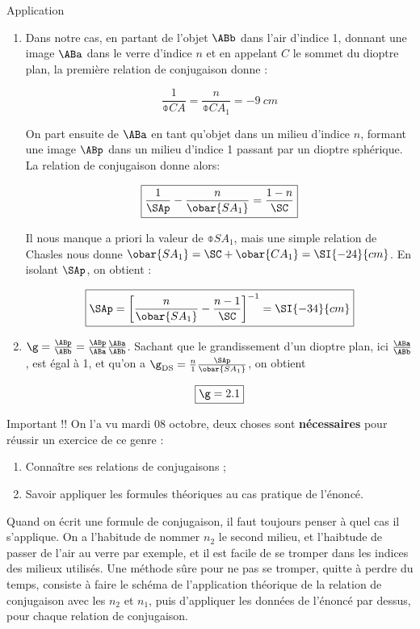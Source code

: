 \documentclass[10pt,notitlepage]{book}
\begin{document}
\begin{NCexem}{Application}
    \begin{enumerate}

        \item Dans notre cas, en partant de l'objet $\ABb$ dans l'air d'indice
            1, donnant une image $\ABa$ dans le verre d'indice $n$ et en
            appelant $C$ le sommet du dioptre plan, la première relation de
            conjugaison donne :

            \[ \boxed{ \frac{1}{\obar{CA}} = \frac{n}{\obar{CA_1}} =
            \SI{-9}{cm}} \]
            
            On part ensuite de $\ABa$ en tant qu'objet dans un milieu d'indice
            $n$, formant une image $\ABp$ dans un milieu d'indice 1 passant par
            un dioptre sphérique. La relation de conjugaison donne alors:
            
            \[ \boxed{ \frac{1}{\SAp} - \frac{n}{\obar{SA_1}} = \frac{1 -
            n}{\SC}}\]
            
            Il nous manque a priori la valeur de $\obar{SA_1}$, mais une simple
            relation de Chasles nous donne $\obar{SA_1} = \SC + \obar{CA_1} =
            \SI{-24}{cm}$. En isolant $\SAp$, on obtient :
            
            \[ \boxed{\SAp = \left[ \frac{n}{\obar{SA_1}} - \frac{n -
            1}{\SC}\right]^{-1} = \SI{-34}{cm}}\]

        \item $\g = \frac{\ABp}{\ABb} = \frac{\ABp}{\ABa} \frac{\ABa}{\ABb}$.
            Sachant que le grandissement d'un dioptre plan, ici $
            \frac{\ABa}{\ABb}$, est égal à 1, et qu'on a $\g _\mathrm{DS} =
            \frac{n}{1} \frac{\SAp}{\obar{SA_1}}$, on obtient

            \[ \boxed{\g = 2.1}\]
    \end{enumerate}
    \end{NCexem}

\begin{NCimpo}{Important !!}
    On l'a vu mardi 08 octobre, deux choses sont \textbf{nécessaires} pour
    réussir un exercice de ce genre :
    \begin{enumerate}
        \item {\huge Connaître ses relations de conjugaisons} ;
        \item {\Huge Savoir appliquer les formules théoriques au cas pratique de
            l'énoncé}.
    \end{enumerate}
    Quand on écrit une formule de conjugaison, il faut toujours penser à quel
    cas il s'applique. On a l'habitude de nommer $n_2$ le second milieu, et
    l'haibtude de passer de l'air au verre par exemple, et il est facile de se
    tromper dans les indices des milieux utilisés. Une méthode sûre pour ne pas
    se tromper, quitte à perdre du temps, consiste à faire le schéma de
    l'application théorique de la relation de conjugaison avec les $n_2$ et
    $n_1$, puis d'appliquer les données de l'énoncé par dessus, pour chaque
    relation de conjugaison.
\end{NCimpo}
\end{document}
